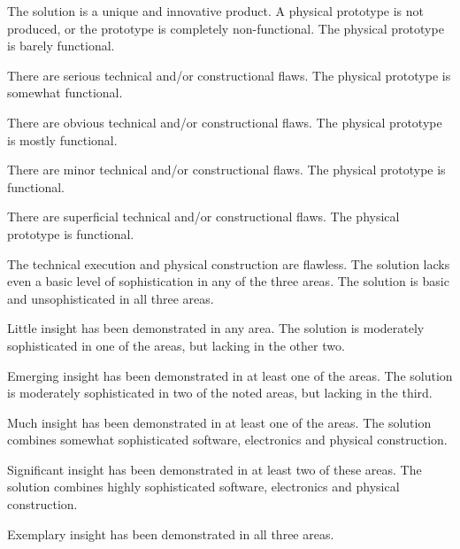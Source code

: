 \documentclass{../fal_assignment}
\begin{document}
\begin{markingrubric}
            \par The solution is a unique and innovative product.
        \grade\fail A physical prototype is not produced, or the prototype is completely non-functional.
        \grade The physical prototype is barely functional.
            \par There are serious technical and/or constructional flaws.
        \grade The physical prototype is somewhat functional.
            \par There are obvious technical and/or constructional flaws.
        \grade The physical prototype is mostly functional.
            \par There are minor technical and/or constructional flaws.
        \grade The physical prototype is functional.
            \par There are superficial technical and/or constructional flaws.
        \grade The physical prototype is functional.
            \par The technical execution and physical construction are flawless.
        \grade\fail The solution lacks even a basic level of sophistication in any of the three areas.
        \grade The solution is basic and unsophisticated in all three areas.
            \par Little insight has been demonstrated in any area.
        \grade The solution is moderately sophisticated in one of the areas, but lacking in the other two.
            \par Emerging insight has been demonstrated in at least one of the areas.
        \grade The solution is moderately sophisticated in two of the noted areas, but lacking in the third.
            \par Much insight has been demonstrated in at least one of the areas.
        \grade The solution combines somewhat sophisticated software, electronics and physical construction.
            \par Significant insight has been demonstrated in at least two of these areas.
        \grade The solution combines highly sophisticated software, electronics and physical construction.
            \par Exemplary insight has been demonstrated in all three areas.

\end{markingrubric}
\end{document}
